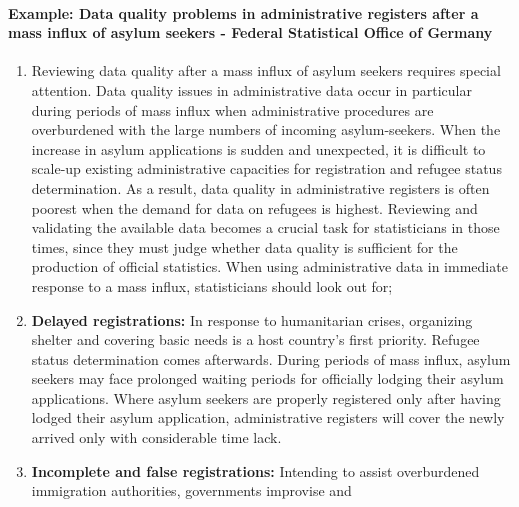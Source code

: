 \documentclass[
]{article}
\begin{document}
\hypertarget{example-data-quality-problems-in-administrative-registers-after-a-mass-influx-of-asylum-seekers---federal-statistical-office-of-germany}{%
\paragraph{\texorpdfstring{Example: \textbf{Data quality problems in administrative registers after a mass influx of asylum seekers - Federal Statistical Office of Germany}}{Example: Data quality problems in administrative registers after a mass influx of asylum seekers - Federal Statistical Office of Germany}}\label{example-data-quality-problems-in-administrative-registers-after-a-mass-influx-of-asylum-seekers---federal-statistical-office-of-germany}}

\begin{enumerate}
\def\labelenumi{\arabic{enumi}.}
\setcounter{enumi}{384}
\item
  Reviewing data quality after a mass influx of asylum seekers
  requires special attention. Data quality issues in administrative
  data occur in particular during periods of mass influx when
  administrative procedures are overburdened with the large numbers of
  incoming asylum-seekers. When the increase in asylum applications is
  sudden and unexpected, it is difficult to scale-up existing
  administrative capacities for registration and refugee status
  determination. As a result, data quality in administrative registers
  is often poorest when the demand for data on refugees is highest.
  Reviewing and validating the available data becomes a crucial task
  for statisticians in those times, since they must judge whether data
  quality is sufficient for the production of official statistics.
  When using administrative data in immediate response to a mass
  influx, statisticians should look out for;
\item
  \textbf{Delayed registrations:} In response to humanitarian crises,
  organizing shelter and covering basic needs is a host country's
  first priority. Refugee status determination comes afterwards.
  During periods of mass influx, asylum seekers may face prolonged
  waiting periods for officially lodging their asylum applications.
  Where asylum seekers are properly registered only after having
  lodged their asylum application, administrative registers will cover
  the newly arrived only with considerable time lack.
\item
  \textbf{Incomplete and false registrations:} Intending to assist
  overburdened immigration authorities, governments improvise and

\end{enumerate}
\end{document}
